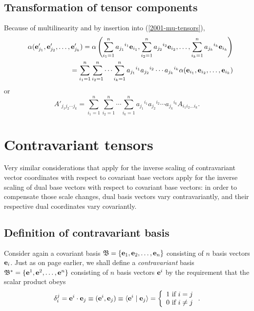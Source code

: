 \subsection{Transformation of tensor components}

Because of multilinearity  and by insertion into
(\ref{2001-mu-tensors}),
\begin{eqnarray}
&&\alpha ( {\bf e}'_{j_1},{\bf e}'_{j_2},\ldots ,{\bf e}'_{j_k})=
\alpha \left(
\sum_{i_1=1}^n {a_{j_1}}^{i_1} {\bf e}_{i_1},
\sum_{i_2=1}^n {a_{j_2}}^{i_2} {\bf e}_{i_2},
\ldots ,
\sum_{i_k=1}^n {a_{j_k}}^{i_k} {\bf e}_{i_k}
\right)
\nonumber \\&& \quad
=
\sum_{i_1=1}^n\sum_{i_2=1}^n\cdots \sum_{i_k=1}^n
{a_{j_1}}^{i_1}{a_{j_2}}^{i_2}\cdots {a_{j_k}}^{i_k} \alpha ( {\bf e}_{i_1},{\bf e}_{i_2},\ldots ,{\bf e}_{i_k})
\label{2012-m-ch-tensor-etotc1}
\end{eqnarray}
or
\begin{equation}
A'_{{j_1}{j_2}\cdots {j_k}}=
\sum_{i_1=1}^n\sum_{i_2=1}^n\cdots \sum_{i_k=1}^n
{a_{j_1}}^{i_1}{a_{j_2}}^{i_2}\cdots {a_{j_k}}^{i_k} A_{i_1 i_2\ldots i_k}.
\label{2011-m-tvtcov}
\end{equation}


\section{Contravariant tensors}

Very similar considerations that apply for the inverse scaling of contravariant vector coordinates with respect to covariant base vectors
apply for the inverse scaling of dual base vectors  with respect to covariant base vectors:
in order to compensate those scale changes, dual basis vectors vary contravariantly,
and their respective dual coordinates vary covariantly.

\subsection{Definition of contravariant basis}

Consider again a covariant basis
${\mathfrak B}=\{{\bf e}_1,{\bf e}_2,\ldots ,{\bf e}_n\}$ consisting of
$n$ basis vectors ${\bf e}_i$.
Just as on page \pageref{2011-m-Dualbasis} earlier, we shall define a {\em contravariant} basis
${\mathfrak B^\ast}=\{{\bf e}^1,{\bf e}^2,\ldots ,{\bf e}^n\}$ consisting of
$n$ basis vectors ${\bf e}^i$
by the requirement that the scalar product obeys
\begin{equation}
\delta_i^j =  {\bf e}^i\cdot{\bf e}_j\equiv ({\bf e}^i,{\bf e}_j)\equiv \langle {\bf e}^i\mid {\bf e}_j\rangle
 =\left\{
 \begin{array}{l}
1 \mbox{ if } i=j \\
0 \mbox{ if } i\neq j  \\
\end{array}
 \right. .
\label{2001-mu-tensors0}
\end{equation}



